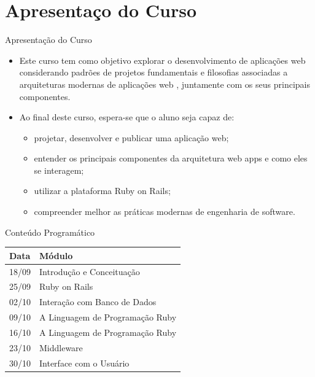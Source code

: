 \section{Apresentaço do Curso}

\begin{frame}[fragile,t]{Apresentação do Curso}
  \begin{itemize}
    \item Este curso tem como objetivo explorar o \alert{desenvolvimento de aplicações web} considerando 
      \alert{padrões de projetos} fundamentais e filosofias associadas a \alert{arquiteturas modernas} de aplicações web
      , juntamente com os seus principais componentes.
    \item Ao final deste curso, espera-se que o aluno seja capaz de:
    \begin{itemize}
      \item projetar, desenvolver e publicar uma aplicação web;
      \item entender os principais \alert{componentes} da arquitetura web apps e como eles se interagem;
      \item utilizar a plataforma Ruby on Rails;
      \item compreender melhor as \alert{práticas} modernas de engenharia de software.
    \end{itemize}
  \end{itemize}
\end{frame}
\begin{frame}[fragile,t]{Conteúdo Programático}
    \begin{center}
      \begin{tabular}{| p{2cm} | p{8cm} |}
	\hline
	\textbf{Data} & \textbf{Módulo} \\ \hline
	18/09 & Introdução e Conceituação \\ \hline
	25/09 & Ruby on Rails \\ \hline
	02/10 & Interação com Banco de Dados \\ \hline
	09/10 & A Linguagem de Programação Ruby \\ \hline
	16/10 & A Linguagem de Programação Ruby \\ \hline
	23/10 & Middleware \\ \hline
	30/10 & Interface com o Usuário \\ \hline
	\hline
      \end{tabular}
    \end{center}  
\end{frame}
